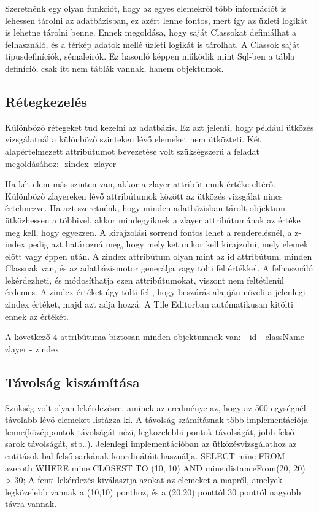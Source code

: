 Szeretnénk egy olyan funkciót, hogy az egyes elemekről több információt is lehessen tárolni az adatbázisban, ez azért lenne fontos, mert így az üzleti logikát is lehetne tárolni benne. Ennek megoldása, hogy saját Classokat definiálhat a felhasználó, és a térkép adatok mellé üzleti logikát is tárolhat. A Classok saját típusdefiníciók, sémaleírók. Ez hasonló képpen működik mint Sql-ben a tábla definíció, csak itt nem táblák vannak, hanem objektumok.

\subsection{Rétegkezelés}

Különböző rétegeket tud kezelni az adatbázis. Ez azt jelenti, hogy például ütközés vizsgálatnál a különböző szinteken lévő elemeket nem ütközteti. Két alapértelmezett attribútumot bevezetése volt szükségszerű a feladat megoldásához:
-zindex
-zlayer

Ha két elem más szinten van, akkor a zlayer attribútumuk értéke eltérő. Különböző zlayereken lévő attribútumok között az ütközés vizsgálat nincs értelmezve. Ha azt szeretnénk, hogy minden adatbázisban tárolt objektum ütközhessen a többivel, akkor mindegyiknek a zlayer attribútumának az értéke meg kell, hogy egyezzen.
A kirajzolási sorrend fontos lehet a renderelésnél, a z-index pedig azt határozná meg, hogy melyiket mikor kell kirajzolni, mely elemek előtt vagy éppen után. A zindex attribútum olyan mint az id attribútum, minden Classnak van, és az adatbázismotor generálja vagy tölti fel értékkel. A felhasználó lekérdezheti, és módosíthatja ezen attribútumokat, viszont nem feltétlenül érdemes. A zindex értéket úgy tölti fel , hogy beszúrás alapján növeli a jelenlegi zindex értéket, majd azt adja hozzá. A Tile Editorban autómatikusan kitölti ennek az értékét.

A következő 4 attribútuma biztosan minden objektumnak van:
- id
- className
- zlayer
- zindex

\subsection{Távolság kiszámítása}

Szükség volt olyan lekérdezésre, aminek az eredménye az, hogy az 500 egységnél távolabb lévő elemeket listázza ki. A távolság számításnak több implementációja lenne(középpontok távolságát nézi, legközelebbi pontok távolságát, jobb felső sarok távolságát, stb..). Jelenlegi implementációban az ütközésvizsgálathoz az entitások bal felső sarkának koordinátáit használja.
SELECT mine
FROM azeroth
WHERE mine CLOSEST TO (10, 10) AND mine.distanceFrom(20, 20) > 30;
A fenti lekérdezés kiválasztja azokat az elemeket a mapről, amelyek legközelebb vannak a (10,10) ponthoz, és a  (20,20) ponttól 30 ponttól nagyobb távra vannak.

